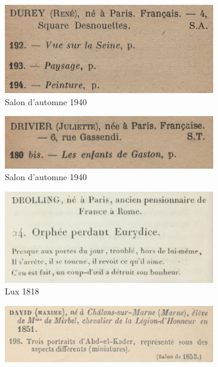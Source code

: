 \documentclass[a4paper,12pt,twoside]{book}
\begin{document}
	
	\begin{figure}[ht]
	\begin{subfigure}{0.5\textwidth}
		\includegraphics[scale=0.5]{automne1940.png	} 
		\centering
		\caption{Salon d'automne 1940}
	\end{subfigure}
	\begin{subfigure}{0.5\textwidth}
	\includegraphics[scale=0.5]{automne1940_2.png	} 
	\centering
	\caption{Salon d'automne 1940}
\end{subfigure}
	\begin{subfigure}{0.5\textwidth}
		\includegraphics[scale=0.4]{lux1818.png}
		\centering
		\caption{Lux 1818}
	\end{subfigure}
	\begin{subfigure}{0.5\textwidth}
		\includegraphics[scale=0.5]{lux1867.png}

\end{subfigure}
\end{figure}
\end{document}
